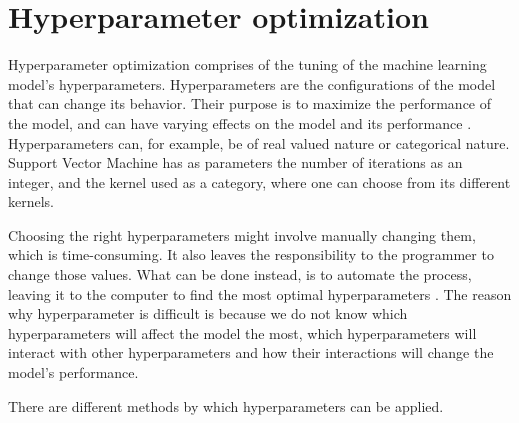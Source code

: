 \section{Hyperparameter optimization}


Hyperparameter optimization comprises of the tuning of the machine learning model's hyperparameters. Hyperparameters are the configurations of the model that can change its behavior. Their purpose is to maximize the performance of the model, and can have varying effects on the model and its performance \cite{hyperparam-search}. Hyperparameters can, for example, be of real valued nature or categorical nature. Support Vector Machine has as parameters the number of iterations as an integer, and the kernel used as a category, where one can choose from its different kernels.


Choosing the right hyperparameters might involve manually changing them, which is time-consuming. It also leaves the responsibility to the programmer to change those values. What can be done instead, is to automate the process, leaving it to the computer to find the most optimal hyperparameters \cite{automated-machine-learning}. The reason why hyperparameter is difficult is because we do not know which hyperparameters will affect the model the most, which hyperparameters will interact with other hyperparameters and how their interactions will change the model's performance.


There are different methods by which hyperparameters can be applied.












